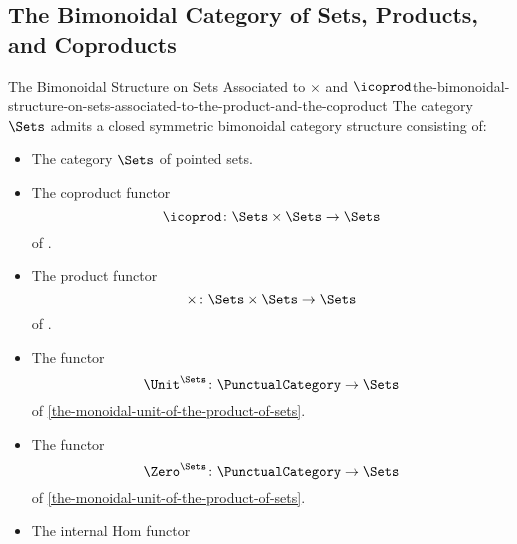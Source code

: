\subsection{The Bimonoidal Category of Sets, Products, and Coproducts}\label{subsection-the-bimonoidal-category-of-sets-products-and-coproducts}
\begin{proposition}{The Bimonoidal Structure on Sets Associated to $\times$ and $\icoprod$}{the-bimonoidal-structure-on-sets-associated-to-the-product-and-the-coproduct}%
    The category $\Sets$ admits a closed symmetric bimonoidal category structure consisting of:%
    \begin{itemize}
        \item{}The category $\Sets$ of pointed sets.
        \item{}The coproduct functor
            \[
                \icoprod%
                \colon%
                \Sets\times\Sets%
                \to%
                \Sets
            \]%
            of .
        \item{}The product functor
            \[
                \times%
                \colon%
                \Sets\times\Sets%
                \to%
                \Sets
            \]%
            of .
        \item{}The functor
            \[
                \Unit^{\Sets}
                \colon
                \PunctualCategory
                \to
                \Sets
            \]%
            of \cref{the-monoidal-unit-of-the-product-of-sets}.
        \item{}The functor
            \[
                \Zero^{\Sets}
                \colon
                \PunctualCategory
                \to
                \Sets
            \]%
            of \cref{the-monoidal-unit-of-the-product-of-sets}.
        \item{}The internal Hom functor

\end{itemize}
\end{proposition}
